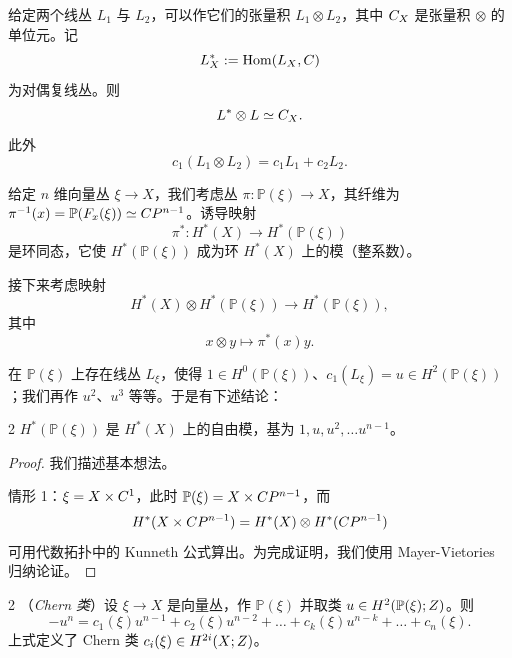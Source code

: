 给定两个线丛 $L_1$ 与 $L_2$，可以作它们的张量积 $L_1\otimes L_2$，其中 $C_X$ 是张量积 $\otimes$ 的单位元。记
\[ L_X^* := \operatorname{Hom}(L_X,C) \]
为对偶复线丛。则
\[ L^*\otimes L\simeq C_X. \]
此外
\[ c_1(L_1\otimes L_2) = c_1 L_1 + c_2 L_2. \]

给定 $n$ 维向量丛 $\xi\to X$，我们考虑丛 $\pi : \mathbb{P}(\xi)\to X$，其纤维为 $\pi^{-1}(x) = \mathbb{P}(F_x(\xi))\simeq C P^{n-1}$。诱导映射
\[ \pi^* : H^*(X)\to H^*(\mathbb{P}(\xi)) \]
是环同态，它使 $H^*(\mathbb{P}(\xi))$ 成为环 $H^*(X)$ 上的模（整系数）。

接下来考虑映射
\[ H^*(X)\otimes H^*(\mathbb{P}(\xi))\to H^*(\mathbb{P}(\xi)), \]
其中
\[ x\otimes y\mapsto \pi^*(x)y. \]

在 $\mathbb{P}(\xi)$ 上存在线丛 $L_\xi$，使得 $1\in H^0(\mathbb{P}(\xi))$、$c_1(L_\xi) = u\in H^2(\mathbb{P}(\xi))$；我们再作 $u^2$、$u^3$ 等等。于是有下述结论：

\begin{thm}{2}
$H^*(\mathbb{P}(\xi))$ 是 $H^*(X)$ 上的自由模，基为 $1,u,u^2,\ldots u^{n-1}$。
\end{thm}

\begin{proof}
我们描述基本想法。

情形 1：$\xi = X\times C^1$，此时 $\mathbb{P}(\xi) = X\times C P^{n-1}$，而
\[ H^*(X\times C P^{n-1}) = H^*(X)\otimes H^*(C P^{n-1}) \]
可用代数拓扑中的 Kunneth 公式算出。为完成证明，我们使用 Mayer-Vietories 归纳论证。
\end{proof}

\begin{defn}{2}
（\emph{Chern 类}）设 $\xi\to X$ 是向量丛，作 $\mathbb{P}(\xi)$ 并取类 $u\in H^2(\mathbb{P}(\xi);Z)$。则
\[ -u^n = c_1(\xi)u^{n-1}+c_2(\xi)u^{n-2}+\ldots+c_k(\xi)u^{n-k}+\ldots+c_n(\xi). \]
上式定义了 Chern 类 $c_i(\xi)\in H^{2i}(X;Z)$。
\end{defn}

